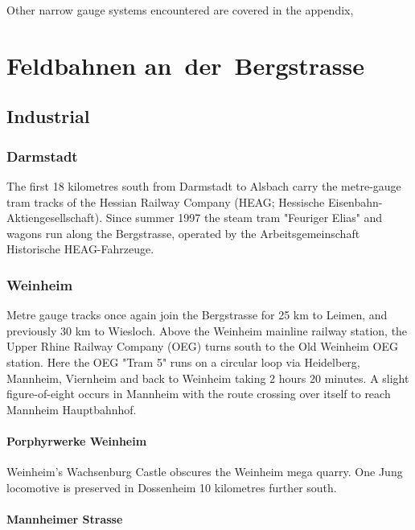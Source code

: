 \documentclass[a4paper]{report}
\begin{document}
Other narrow gauge systems encountered are covered in the appendix, 


\part{Feldbahnen an~der~Bergstrasse}

\chapter{Industrial}
\section{Darmstadt}

The first 18 kilometres south from Darmstadt to Alsbach carry the
metre-gauge tram tracks of the Hessian Railway Company (HEAG;
Hessische Eisenbahn-Aktiengesellschaft).  Since summer 1997 the steam
tram "Feuriger Elias" and wagons run along the Bergstrasse, operated
by the Arbeitsgemeinschaft Historische HEAG-Fahrzeuge.

\section{Weinheim}

Metre gauge tracks once again join the Bergstrasse for 25 km to
Leimen, and previously 30 km to Wiesloch.  Above the Weinheim mainline
railway station, the Upper Rhine Railway Company (OEG) turns south to
the Old Weinheim OEG station.  Here the OEG "Tram 5" runs on a
circular loop via Heidelberg, Mannheim, Viernheim and back to Weinheim
taking 2 hours 20 minutes.  A slight figure-of-eight occurs in
Mannheim with the route crossing over itself to reach Mannheim Hauptbahnhof.

\subsection{Porphyrwerke Weinheim}

Weinheim's Wachsenburg Castle obscures the Weinheim mega quarry.  One
Jung locomotive is preserved in Dossenheim 10 kilometres further south.

\subsection{Mannheimer Strasse}
\end{document}
